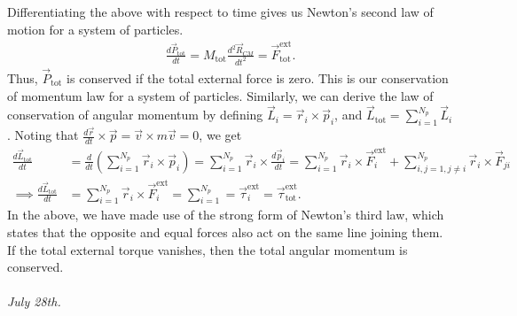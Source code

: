 Differentiating the above with respect to time gives us Newton's second law of motion for a system of particles.
\begin{align}
    \frac{d\vec{P}_{\text{tot}}}{dt} = M_{\text{tot}} \frac{d^{2}\vec{R}_{CM}}{dt^{2}} = \vec{F}_{\text{tot}}^{\text{ext}}.
\end{align}
Thus, $\vec{P}_{\text{tot}}$ is conserved if the total external force is zero. This is our conservation of momentum law for a system of particles. Similarly, we can derive the law of conservation of angular momentum by defining $\vec{L}_{i} = \vec{r}_{i} \times \vec{p}_{i}$, and $\vec{L}_{\text{tot}} = \sum_{i=1}^{N_{p}} \vec{L}_{i}$. Noting that $\frac{d\vec{r}}{dt} \times \vec{p} = \vec{v} \times m\vec{v} = 0$, we get
\begin{align}
    \frac{d\vec{L}_{\text{tot}}}{dt} &= \frac{d}{dt} \left( \sum_{i=1}^{N_{p}} \vec{r}_{i} \times \vec{p}_{i} \right) = \sum_{i=1}^{N_{p}} \vec{r}_{i} \times \frac{d\vec{p}_{i}}{dt} = \sum_{i=1}^{N_{p}} \vec{r}_{i} \times \vec{F}_{i}^{\text{ext}} + \sum_{i,j=1, j \neq i}^{N_{p}} \vec{r}_{i} \times \vec{F}_{ji} \\
    \implies \frac{d\vec{L}_{\text{tot}}}{dt} &= \sum_{i=1}^{N_{p}} \vec{r}_{i} \times \vec{F}_{i}^{\text{ext}} = \sum_{i=1}^{N_{p}} = \vec{\tau}_{i}^{\text{ext}} = \vec{\tau}_{\text{tot}}^{\text{ext}}.
\end{align}
In the above, we have made use of the strong form of Newton's third law, which states that the opposite and equal forces also act on the same line joining them. If the total external torque vanishes, then the total angular momentum is conserved.\\ \\
\textit{July 28th.}

